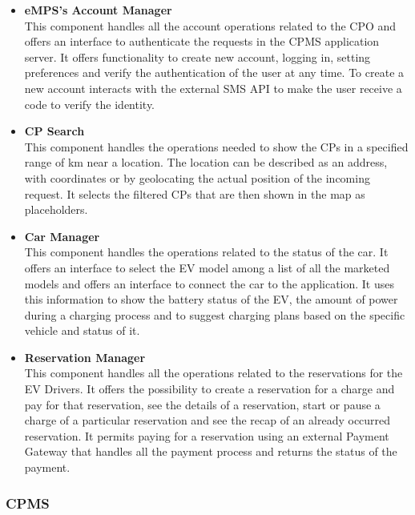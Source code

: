 \begin{itemize}
    \item \textbf{eMPS's Account Manager} \\ This component handles all the account operations related to the CPO and offers an interface to authenticate
          the requests in the CPMS application server.
          It offers functionality to create new account, logging in, setting preferences and verify the authentication of the user at any time.
          To create a new account interacts with the external SMS API to make the user receive a code to verify the identity.
    \item \textbf{CP Search} \\ This component handles the operations needed to show the CPs in a specified range of km near a location. The location
          can be described as an address, with coordinates or by geolocating the actual position of the incoming request. It selects the filtered CPs that are then
          shown in the map as placeholders.
    \item \textbf{Car Manager} \\ This component handles the operations related to the status of the car. It offers an interface to select the EV model among a list of
          all the marketed models and offers an interface to connect the car to the application. It uses this information to show the battery status of the EV, the
          amount of power during a charging process and to suggest charging plans based on the specific vehicle and status of it.
    \item \textbf{Reservation Manager} \\ This component handles all the operations related to the reservations for the EV Drivers. It offers the possibility to create a reservation
          for a charge and pay for that reservation, see the details of a reservation, start or pause a charge of a particular reservation and see the recap of an already occurred reservation.
          It permits paying for a reservation using an external Payment Gateway that handles all the payment process and returns the status of the payment.
\end{itemize}


\subsubsection{CPMS}

